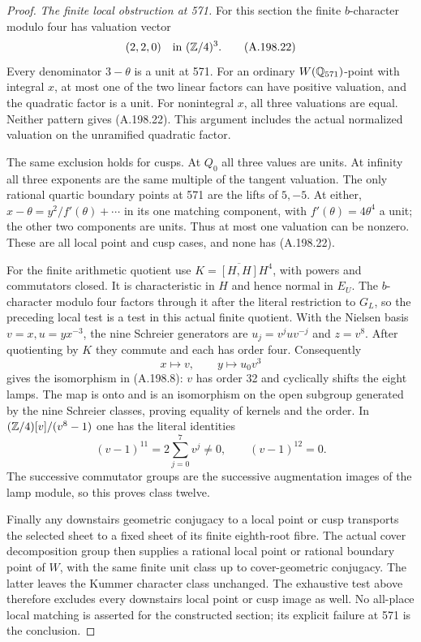\begin{proof}
\emph{The finite local obstruction at 571.}
For this section the finite \(b\)-character modulo four has
valuation vector
\[
                              (2,2,0)\quad\text{in }(\mathbb Z/4)^3.
\tag{A.198.22}
\]
Every denominator \(3-\theta\) is a unit at 571.
For an ordinary \(W(\mathbb Q_{571})\)-point with integral \(x\),
at most one of the two linear factors can have positive
valuation, and the quadratic factor is a unit.  For nonintegral
\(x\), all three valuations are equal.  Neither pattern gives
(A.198.22).  This argument includes the actual normalized
valuation on the unramified quadratic factor.

The same exclusion holds for cusps.  At \(Q_0\) all three
values are units.  At infinity all three exponents are the same
multiple of the tangent valuation.  The only rational quartic
boundary points at 571 are the lifts of \(5,-5\).  At either,
\(x-\theta=y^2/f'(\theta)+\cdots\) in its one matching
component, with \(f'(\theta)=4\theta^4\) a unit; the other
two components are units.  Thus at most one valuation can be
nonzero.  These are all local point and cusp cases, and none
has (A.198.22).

For the finite arithmetic quotient use
\(K=\overline{[H,H]}H^4\), with powers and commutators closed.
It is characteristic in \(H\) and hence normal in \(E_U\).
The \(b\)-character modulo four factors through it after the
literal restriction to \(G_L\), so the preceding local test
is a test in this actual finite quotient.
With the Nielsen basis \(v=x,u=yx^{-3}\), the nine Schreier
generators are \(u_j=v^juv^{-j}\) and \(z=v^8\).
After quotienting by \(K\) they commute and each has order four.
Consequently
\[
        x\longmapsto v,\qquad y\longmapsto u_0v^3
\tag{A.198.23}
\]
gives the isomorphism in (A.198.8): \(v\) has order 32 and
cyclically shifts the eight lamps.  The map is onto and is an
isomorphism on the open subgroup generated by the nine
Schreier classes, proving equality of kernels and the order.
In \((\mathbb Z/4)[v]/(v^8-1)\) one has the literal identities
\[
           (v-1)^{11}=2\sum_{j=0}^7v^j\ne0,
                     \qquad (v-1)^{12}=0.
\tag{A.198.24}
\]
The successive commutator groups are the successive augmentation
images of the lamp module, so this proves class twelve.

Finally any downstairs geometric conjugacy to a local point or
cusp transports the selected sheet to a fixed sheet of its
finite eighth-root fibre.  The actual cover decomposition group
then supplies a rational local point or rational boundary point
of \(W\), with the same finite unit class up to cover-geometric
conjugacy.  The latter leaves the Kummer character class unchanged.
The exhaustive test above therefore excludes every downstairs
local point or cusp image as well.  No all-place local matching
is asserted for the constructed section; its explicit failure
at 571 is the conclusion.


\end{proof}
